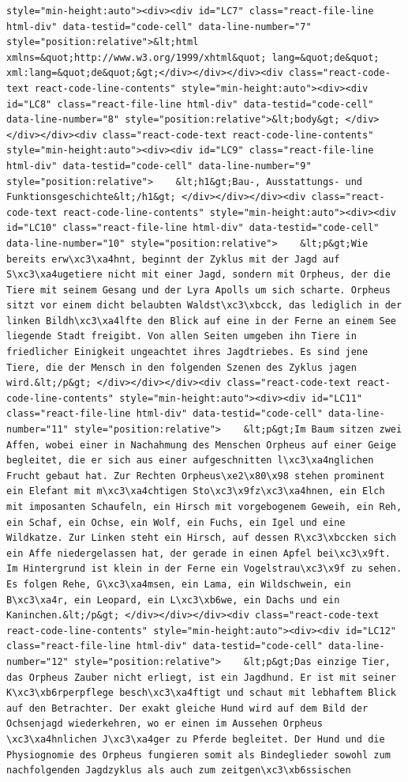 \documentclass[
  letterpaper,
]{book}
\begin{document}
\begin{verbatim}
style="min-height:auto"><div><div id="LC7" class="react-file-line html-div" data-testid="code-cell" data-line-number="7" style="position:relative">&lt;html xmlns=&quot;http://www.w3.org/1999/xhtml&quot; lang=&quot;de&quot; xml:lang=&quot;de&quot;&gt;</div></div></div><div class="react-code-text react-code-line-contents" style="min-height:auto"><div><div id="LC8" class="react-file-line html-div" data-testid="code-cell" data-line-number="8" style="position:relative">&lt;body&gt; </div></div></div><div class="react-code-text react-code-line-contents" style="min-height:auto"><div><div id="LC9" class="react-file-line html-div" data-testid="code-cell" data-line-number="9" style="position:relative">    &lt;h1&gt;Bau-, Ausstattungs- und Funktionsgeschichte&lt;/h1&gt; </div></div></div><div class="react-code-text react-code-line-contents" style="min-height:auto"><div><div id="LC10" class="react-file-line html-div" data-testid="code-cell" data-line-number="10" style="position:relative">    &lt;p&gt;Wie bereits erw\xc3\xa4hnt, beginnt der Zyklus mit der Jagd auf S\xc3\xa4ugetiere nicht mit einer Jagd, sondern mit Orpheus, der die Tiere mit seinem Gesang und der Lyra Apolls um sich scharte. Orpheus sitzt vor einem dicht belaubten Waldst\xc3\xbcck, das lediglich in der linken Bildh\xc3\xa4lfte den Blick auf eine in der Ferne an einem See liegende Stadt freigibt. Von allen Seiten umgeben ihn Tiere in friedlicher Einigkeit ungeachtet ihres Jagdtriebes. Es sind jene Tiere, die der Mensch in den folgenden Szenen des Zyklus jagen wird.&lt;/p&gt; </div></div></div><div class="react-code-text react-code-line-contents" style="min-height:auto"><div><div id="LC11" class="react-file-line html-div" data-testid="code-cell" data-line-number="11" style="position:relative">    &lt;p&gt;Im Baum sitzen zwei Affen, wobei einer in Nachahmung des Menschen Orpheus auf einer Geige begleitet, die er sich aus einer aufgeschnitten l\xc3\xa4nglichen Frucht gebaut hat. Zur Rechten Orpheus\xe2\x80\x98 stehen prominent ein Elefant mit m\xc3\xa4chtigen Sto\xc3\x9fz\xc3\xa4hnen, ein Elch mit imposanten Schaufeln, ein Hirsch mit vorgebogenem Geweih, ein Reh, ein Schaf, ein Ochse, ein Wolf, ein Fuchs, ein Igel und eine Wildkatze. Zur Linken steht ein Hirsch, auf dessen R\xc3\xbccken sich ein Affe niedergelassen hat, der gerade in einen Apfel bei\xc3\x9ft. Im Hintergrund ist klein in der Ferne ein Vogelstrau\xc3\x9f zu sehen. Es folgen Rehe, G\xc3\xa4msen, ein Lama, ein Wildschwein, ein B\xc3\xa4r, ein Leopard, ein L\xc3\xb6we, ein Dachs und ein Kaninchen.&lt;/p&gt; </div></div></div><div class="react-code-text react-code-line-contents" style="min-height:auto"><div><div id="LC12" class="react-file-line html-div" data-testid="code-cell" data-line-number="12" style="position:relative">    &lt;p&gt;Das einzige Tier, das Orpheus Zauber nicht erliegt, ist ein Jagdhund. Er ist mit seiner K\xc3\xb6rperpflege besch\xc3\xa4ftigt und schaut mit lebhaftem Blick auf den Betrachter. Der exakt gleiche Hund wird auf dem Bild der Ochsenjagd wiederkehren, wo er einen im Aussehen Orpheus \xc3\xa4hnlichen J\xc3\xa4ger zu Pferde begleitet. Der Hund und die Physiognomie des Orpheus fungieren somit als Bindeglieder sowohl zum nachfolgenden Jagdzyklus als auch zum zeitgen\xc3\xb6ssischen 
\end{verbatim}
\end{document}

